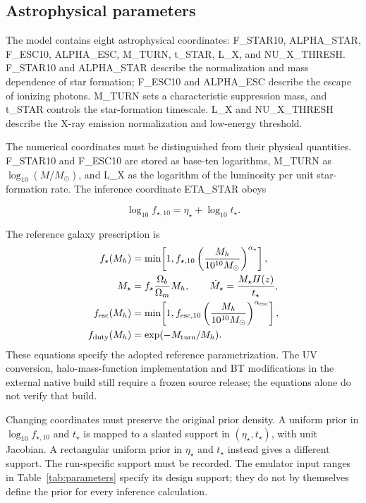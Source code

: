 \subsection{Astrophysical parameters}\label{astrophysical-parameters}

The model contains eight astrophysical coordinates: F\_STAR10, ALPHA\_STAR, F\_ESC10, ALPHA\_ESC, M\_TURN, t\_STAR, L\_X, and NU\_X\_THRESH. F\_STAR10 and ALPHA\_STAR describe the normalization and mass dependence of star formation; F\_ESC10 and ALPHA\_ESC describe the escape of ionizing photons. M\_TURN sets a characteristic suppression mass, and t\_STAR controls the star-formation timescale. L\_X and NU\_X\_THRESH describe the X-ray emission normalization and low-energy threshold.

The numerical coordinates must be distinguished from their physical quantities. F\_STAR10 and F\_ESC10 are stored as base-ten logarithms, M\_TURN as $\log_{10}(M/M_\odot)$, and L\_X as the logarithm of the luminosity per unit star-formation rate. The inference coordinate ETA\_STAR obeys

\begin{equation}\log_{10}f_{\star,10}=\eta_\star+\log_{10}t_\star.\end{equation}

The reference galaxy prescription \cite{Park2019} is
\begin{align}
f_\star(M_h)&=\min\!\left[1,f_{\star,10}\left(\frac{M_h}{10^{10}M_\odot}\right)^{\alpha_\star}\right],\\
M_\star&=f_\star\frac{\Omega_b}{\Omega_m}M_h,\qquad
\dot M_\star=\frac{M_\star H(z)}{t_\star},\\
f_{\rm esc}(M_h)&=\min\!\left[1,f_{{\rm esc},10}\left(\frac{M_h}{10^{10}M_\odot}\right)^{\alpha_{\rm esc}}\right],\\
f_{\rm duty}(M_h)&=\exp(-M_{\rm turn}/M_h).
\end{align}
These equations specify the adopted reference parametrization. The UV conversion, halo-mass-function implementation and BT modifications in the external native build still require a frozen source release; the equations alone do not verify that build.

Changing coordinates must preserve the original prior density. A uniform prior in $\log_{10} f_{\star,10}$ and $t_\star$ is mapped to a slanted support in $(\eta_\star,t_\star)$, with unit Jacobian. A rectangular uniform prior in $\eta_\star$ and $t_\star$ instead gives a different support. The run-specific support must be recorded. The emulator input ranges in Table~\ref{tab:parameters} specify its design support; they do not by themselves define the prior for every inference calculation.

